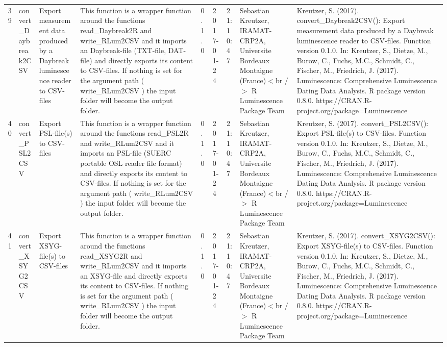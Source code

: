 \begin{table}[ht]
\begin{tabular}{rllllllll}
 \\ 
  39 & convert\_Daybreak2CSV & Export measurement data produced by a Daybreak luminescence reader to CSV-files & This function is a wrapper function around the functions  read\_Daybreak2R  and write\_RLum2CSV  and it imports an Daybreak-file (TXT-file, DAT-file) and directly exports its content to CSV-files.  If nothing is set for the argument  path  ( write\_RLum2CSV ) the input folder will become the output folder. & 0.1.0 & 2017-01-24 & 21:10:47
 & Sebastian Kreutzer, IRAMAT-CRP2A, Universite Bordeaux Montaigne (France)$<$br /$>$  R Luminescence Package Team & Kreutzer, S. (2017). convert\_Daybreak2CSV(): Export measurement data produced by a Daybreak luminescence reader to CSV-files. Function version 0.1.0. In: Kreutzer, S., Dietze, M., Burow, C., Fuchs, M.C., Schmidt, C., Fischer, M., Friedrich, J. (2017). Luminescence: Comprehensive Luminescence Dating Data Analysis. R package version 0.8.0. https://CRAN.R-project.org/package=Luminescence
 \\ 
  40 & convert\_PSL2CSV & Export PSL-file(s) to CSV-files & This function is a wrapper function around the functions  read\_PSL2R  and write\_RLum2CSV  and it imports an PSL-file (SUERC portable OSL reader file format) and directly exports its content to CSV-files. If nothing is set for the argument  path  ( write\_RLum2CSV ) the input folder will become the output folder. & 0.1.0 & 2017-01-24 & 21:10:47
 & Sebastian Kreutzer, IRAMAT-CRP2A, Universite Bordeaux Montaigne (France)$<$br /$>$  R Luminescence Package Team & Kreutzer, S. (2017). convert\_PSL2CSV(): Export PSL-file(s) to CSV-files. Function version 0.1.0. In: Kreutzer, S., Dietze, M., Burow, C., Fuchs, M.C., Schmidt, C., Fischer, M., Friedrich, J. (2017). Luminescence: Comprehensive Luminescence Dating Data Analysis. R package version 0.8.0. https://CRAN.R-project.org/package=Luminescence
 \\ 
  41 & convert\_XSYG2CSV & Export XSYG-file(s) to CSV-files & This function is a wrapper function around the functions  read\_XSYG2R  and write\_RLum2CSV  and it imports an XSYG-file and directly exports its content to CSV-files. If nothing is set for the argument  path  ( write\_RLum2CSV ) the input folder will become the output folder. & 0.1.0 & 2017-01-24 & 21:10:47
 & Sebastian Kreutzer, IRAMAT-CRP2A, Universite Bordeaux Montaigne (France)$<$br /$>$  R Luminescence Package Team & Kreutzer, S. (2017). convert\_XSYG2CSV(): Export XSYG-file(s) to CSV-files. Function version 0.1.0. In: Kreutzer, S., Dietze, M., Burow, C., Fuchs, M.C., Schmidt, C., Fischer, M., Friedrich, J. (2017). Luminescence: Comprehensive Luminescence Dating Data Analysis. R package version 0.8.0. https://CRAN.R-project.org/package=Luminescence

\end{tabular}
\end{table}
